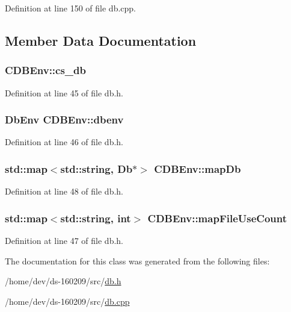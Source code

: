 Definition at line 150 of file db.\+cpp.



\subsection{Member Data Documentation}
\hypertarget{class_c_d_b_env_af71bf28f9142c38aedc550353270b2b7}{}
\subsubsection[{cs\+\_\+db}]{ C\+D\+B\+Env\+::cs\+\_\+db\hspace{0.3cm}{\ttfamily [mutable]}}\label{class_c_d_b_env_af71bf28f9142c38aedc550353270b2b7}


Definition at line 45 of file db.\+h.

\hypertarget{class_c_d_b_env_a50a70690e7f688f5e92a972e7fa18668}{}
\subsubsection[{dbenv}]{\setlength{\rightskip}{0pt plus 5cm}Db\+Env C\+D\+B\+Env\+::dbenv}\label{class_c_d_b_env_a50a70690e7f688f5e92a972e7fa18668}


Definition at line 46 of file db.\+h.

\hypertarget{class_c_d_b_env_a89184b6635285b963fa4d80fc292b386}{}
\subsubsection[{map\+Db}]{\setlength{\rightskip}{0pt plus 5cm}std\+::map$<$std\+::string, Db$\ast$$>$ C\+D\+B\+Env\+::map\+Db}\label{class_c_d_b_env_a89184b6635285b963fa4d80fc292b386}


Definition at line 48 of file db.\+h.

\hypertarget{class_c_d_b_env_a3b8a3caf48395ef3f05e3717b33bf32c}{}
\subsubsection[{map\+File\+Use\+Count}]{\setlength{\rightskip}{0pt plus 5cm}std\+::map$<$std\+::string, int$>$ C\+D\+B\+Env\+::map\+File\+Use\+Count}\label{class_c_d_b_env_a3b8a3caf48395ef3f05e3717b33bf32c}


Definition at line 47 of file db.\+h.



The documentation for this class was generated from the following files\+:\begin{DoxyCompactItemize}
\item 
/home/dev/ds-\/160209/src/\hyperlink{db_8h}{db.\+h}\item 
/home/dev/ds-\/160209/src/\hyperlink{db_8cpp}{db.\+cpp}\end{DoxyCompactItemize}

